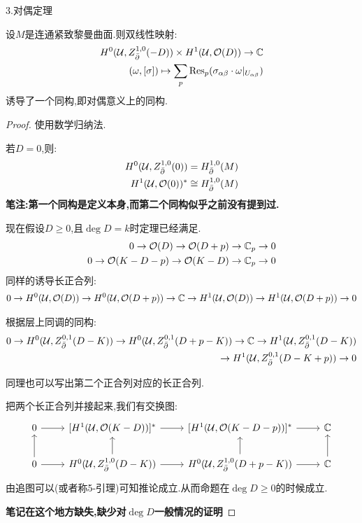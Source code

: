 3.对偶定理
\begin{theorem}
	设$M$是连通紧致黎曼曲面.则双线性映射:
	\begin{align*}
		H^0(\mathcal{U},Z_{\bar{\partial}}^{1,0}(-D)) \times H^1(\mathcal{U},\mathcal{O}(D)) \to \mathbb{C}\\
		(\omega,[\sigma]) \mapsto \sum_p \mathrm{Res}_p (\sigma_{\alpha\beta} \cdot \omega|_{U_{\alpha\beta}})
	\end{align*}
	诱导了一个同构,即对偶意义上的同构.
\end{theorem}
\begin{proof}
	使用数学归纳法.
	
	若$D=0$,则:
	\begin{align*}
		H^0(\mathcal{U},Z_{\bar{\partial}}^{1,0}(0))=H^{1,0}_{\bar{\partial}}(M)\\
		H^1(\mathcal{U},\mathcal{O}(0))^*\cong H^{1,0}_{\bar{\partial}}(M)
	\end{align*}
	\textbf{笔注:第一个同构是定义本身,而第二个同构似乎之前没有提到过.}

	现在假设$D\geq 0$,且$\deg D=k$时定理已经满足.
	\begin{align*}
	    0 \to \mathcal{O}(D) \to \mathcal{O}(D+p) \to \mathbb{C}_p \to 0\\
		0 \to \mathcal{O}(K-D-p) \to \mathcal{O}(K-D) \to \mathbb{C}_p \to 0
	\end{align*}
	同样的诱导长正合列:
	\begin{align*}
		0 \to H^0(\mathcal{U},\mathcal{O}(D)) \to H^0(\mathcal{U},\mathcal{O}(D+p)) \to \mathbb{C} \to H^1(\mathcal{U},\mathcal{O}(D)) \to H^1(\mathcal{U},\mathcal{O}(D+p)) \to 0 
	\end{align*}

   根据层上同调的同构:
   \begin{align*}
	0 \to H^0(\mathcal{U},Z_{\bar{\partial}}^{0,1}(D-K)) \to H^0(\mathcal{U},Z_{\bar{\partial}}^{0,1}(D+p-K)) \to \mathbb{C} \to H^1(\mathcal{U},Z_{\bar{\partial}}^{0,1}(D-K)) \\\to H^1(\mathcal{U},Z_{\bar{\partial}}^{0,1}(D-K+p)) \to 0 
   \end{align*}

   同理也可以写出第二个正合列对应的长正合列.

   把两个长正合列并接起来,我们有交换图:
   \[\begin{tikzcd}
	0 & {[H^1(\U,\OO(K-D))]^*} & {[H^1(\U,\OO(K-D-p))]^*} & \C \\
	0 & {H^0(\U,Z^{1,0}_{\bpa}(D-K))} & {H^0(\U,Z^{1,0}_{\bpa}(D+p-K))} & \C
	\arrow[from=1-1, to=1-2]
	\arrow[from=1-2, to=1-3]
	\arrow[from=1-3, to=1-4]
	\arrow[from=2-1, to=1-1]
	\arrow[from=2-1, to=2-2]
	\arrow[from=2-2, to=1-2]
	\arrow[from=2-2, to=2-3]
	\arrow[from=2-3, to=1-3]
	\arrow[from=2-3, to=2-4]
	\arrow[from=2-4, to=1-4]
\end{tikzcd}\]
    由追图可以(或者称5-引理)可知推论成立.从而命题在$\deg D\geq 0$的时候成立.

	\textbf{笔记在这个地方缺失,缺少对$\deg D$一般情况的证明}
\end{proof}

